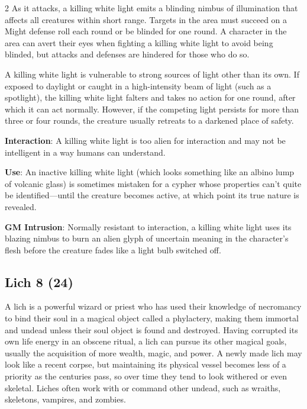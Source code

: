 \begin{multicols}{2}
As it attacks, a killing white light emits a blinding nimbus of illumination that affects all creatures within short range. Targets in the area must succeed on a Might defense roll each round or be blinded for one round. A character in the area can avert their eyes when fighting a killing white light to avoid being blinded, but attacks and defenses are hindered for those who do so. 

A killing white light is vulnerable to strong sources of light other than its own. If exposed to daylight or caught in a high-intensity beam of light (such as a spotlight), the killing white light falters and takes no action for one round, after which it can act normally. However, if the competing light persists for more than three or four rounds, the creature usually retreats to a darkened place of safety.

\textbf{Interaction}: A killing white light is too alien for interaction and may not be intelligent in a way humans can understand.

\textbf{Use}: An inactive killing white light (which looks something like an albino lump of volcanic glass) is sometimes mistaken for a cypher whose properties can’t quite be identified—until the creature becomes active, at which point its true nature is revealed.

\textbf{GM Intrusion}: Normally resistant to interaction, a killing white light uses its blazing nimbus to burn an alien glyph of uncertain meaning in the character’s flesh before the creature fades like a light bulb switched off.

\subsection{Lich 8 (24)}

A lich is a powerful wizard or priest who has used their knowledge of necromancy to bind their soul in a magical object called a phylactery, making them immortal and undead unless their soul object is found and destroyed. Having corrupted its own life energy in an obscene ritual, a lich can pursue its other magical goals, usually the acquisition of more wealth, magic, and power. A newly made lich may look like a recent corpse, but maintaining its physical vessel becomes less of a priority as the centuries pass, so over time they tend to look withered or even skeletal. Liches often work with or command other undead, such as wraiths, skeletons, vampires, and zombies. 


\end{multicols}

